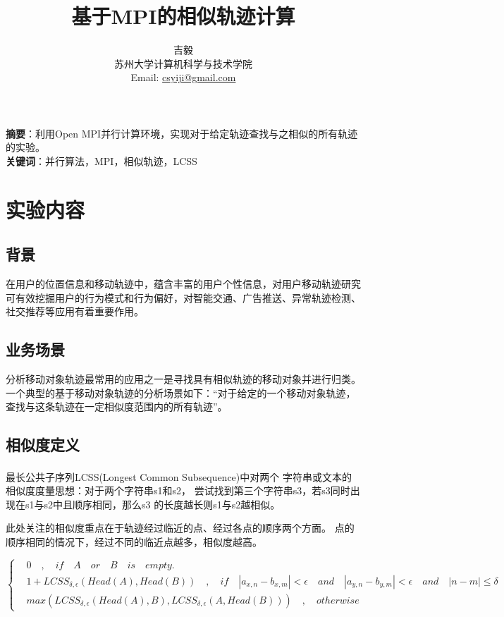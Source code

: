 \documentclass[UTF8]{ctexart}
\title{\huge{\heiti 基于MPI的相似轨迹计算}}
\author{\small{\kaishu 吉毅}\\[2pt]
\small{\kaishu 苏州大学计算机科学与技术学院}\\[2pt]
\small{Email:}
\url{csyiji@gmail.com}
}
\date{} %
\newcommand{\supercite}[1]{\textsuperscript{\cite{#1}}}
\begin{document}
\maketitle

\begin{flushleft}
\textbf{摘要}：利用Open MPI\supercite{openmpi}并行计算环境，实现对于给定轨迹查找与之相似的所有轨迹的实验。\\[8pt]
\textbf{关键词}：并行算法，MPI，相似轨迹，LCSS
\end{flushleft}
\section{实验内容}\label{sec1}

\subsection{背景}
在用户的位置信息和移动轨迹中，蕴含丰富的用户个性信息，对用户移动轨迹研究可有效挖掘用户的行为模式和行为偏好，对智能交通、广告推送、异常轨迹检测、社交推荐等应用有着重要作用。

\subsection{业务场景}
分析移动对象轨迹最常用的应用之一是寻找具有相似轨迹的移动对象并进行归类。一个典型的基于移动对象轨迹的分析场景如下：“对于给定的一个移动对象轨迹，查找与这条轨迹在一定相似度范围内的所有轨迹”。

\subsection{相似度定义}
\label{sec1:subsec3}
最长公共子序列LCSS(Longest Common Subsequence)\supercite{lcss}中对两个 字符串或文本的相似度度量思想：对于两个字符串s1和s2， 尝试找到第三个字符串s3，若s3同时出现在s1与s2中且顺序相同，那么s3 的长度越长则s1与s2越相似。

此处关注的相似度重点在于轨迹经过临近的点、经过各点的顺序两个方面。
点的顺序相同的情况下，经过不同的临近点越多，相似度越高。

\begin{equation}
\label{sec1:subsec3:eq1}
\left\{
\begin{aligned}
& 0 \quad , \quad if \quad A \quad or \quad B \quad is \quad empty. \\
& 1+LCSS_{\delta,\epsilon}(Head(A),Head(B))\quad , \quad if \quad |a_{x,n}-b_{x,m}|<\epsilon \quad and \quad |a_{y,n}-b_{y,m}|<\epsilon \quad and \quad |n-m|\leq \delta \\
& max(LCSS_{\delta,\epsilon}(Head(A),B),LCSS_{\delta,\epsilon}(A,Head(B))) \quad , \quad otherwise
\end{aligned}
\right.
\end{equation}
\end{document}
